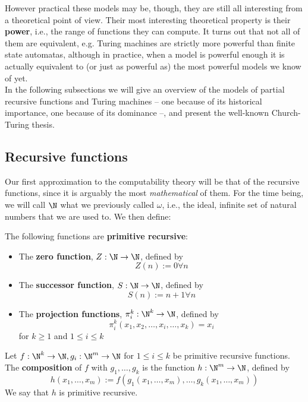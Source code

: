 \documentclass[../main.tex]{memoir}
\begin{document}
However practical these models may be, though, they are still all interesting from a theoretical point of view. Their most interesting theoretical property is their \textbf{power}, i.e., the range of functions they can compute. It turns out that not all of them are equivalent, e.g. Turing machines are strictly more powerful than finite state automatas, although in practice, when a model is powerful enough it is actually equivalent to (or just as powerful as) the most powerful models we know of yet. \\

In the following subsections we will give an overview of the models of partial recursive functions and Turing machines -- one because of its historical importance, one because of its dominance --, and present the well-known Church-Turing thesis.

\subsection{Recursive functions}

Our first approximation to the computability theory will be that of the recursive functions, since it is arguably the most \textit{mathematical} of them. For the time being, we will call $\N$ what we previously called $\omega$, i.e., the ideal, infinite set of natural numbers that we are used to. We then define:

\begin{definition}
  \label{def:initial-functions}
  The following functions are \textbf{primitive recursive}:

  \begin{itemize}
  \item The \textbf{zero function}, $Z: \N \to \N$, defined by
    \[ Z(n) := 0 \forall n \]
  \item The \textbf{successor function}, $S: \N \to \N$, defined by
    \[ S(n) := n + 1 \forall n \]
  \item The \textbf{projection functions}, $\pi_i^k: \N^k \to \N$, defined by
    \[ \pi_i^k(x_1, x_2, \ldots, x_i, \ldots, x_k) = x_i \]
    for $k \ge 1$ and $1 \le i \le k$
  \end{itemize}
\end{definition}

\begin{definition}[Composition]
  Let $f: \N^k \to \N, g_i: \N^m \to \N$ for $1 \le i \le k$ be primitive recursive functions. The \textbf{composition} of $f$ with $g_1, \ldots, g_k$ is the function $h: \N^m \to \N$, defined by
  \[ h(x_1, \ldots, x_m) := f(g_1(x_1, \ldots, x_m), \ldots, g_k(x_1, \ldots, x_m)) \]
  We say that $h$ is primitive recursive.
\end{definition}
\end{document}
